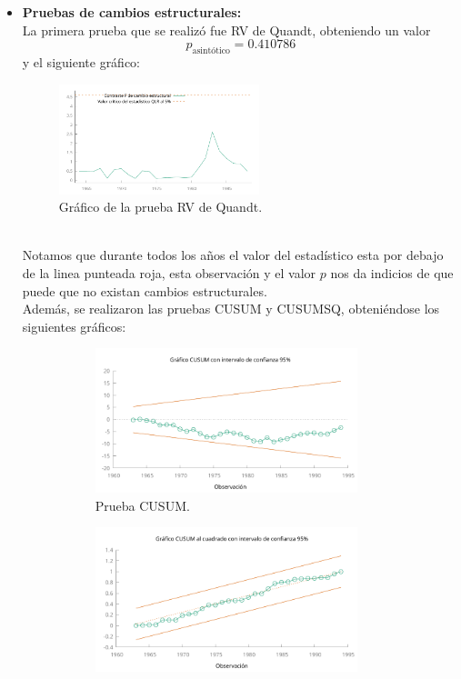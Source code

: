 \documentclass[12pt]{article}
\begin{document}
\begin{itemize}
    \item \textbf{Pruebas de cambios estructurales:}\\
    La primera prueba que se realizó fue RV de Quandt, obteniendo un valor $$p_{\text{asintótico}} = 0.410786$$ y 
    el siguiente gráfico:
    \begin{figure}[h!]
        \centering
        \includegraphics[width=0.55\textwidth]{imagenes/rv_quandt.pdf}
        \caption{Gráfico de la prueba RV de Quandt.}
        \label{fig:rv_quandt}
    \end{figure}\\
    Notamos que durante todos los años el valor del estadístico esta por debajo de la linea
    punteada roja, esta observación y el valor $p$ nos da indicios de que puede que no existan 
    cambios estructurales.\\
    Además, se realizaron las pruebas CUSUM y CUSUMSQ, obteniéndose los siguientes gráficos:
    \begin{figure}[h!]
        \centering
        \begin{subfigure}[b]{0.47\textwidth}
            \includegraphics[width=0.9\textwidth]{imagenes/cusum.pdf}
            \caption{Prueba CUSUM.}
            \label{fig:cusum}
        \end{subfigure}
        \hfill
        \begin{subfigure}[b]{0.47\textwidth}
            \includegraphics[width=0.9\textwidth]{imagenes/cusumsq.pdf}

\end{subfigure}
\end{figure}
\end{itemize}
\end{document}

